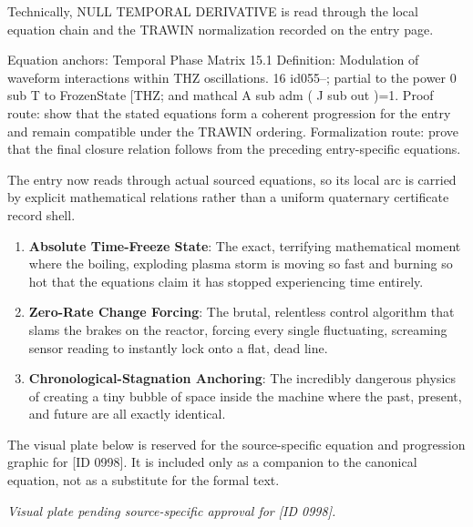 Technically, NULL TEMPORAL DERIVATIVE is read through the local equation chain and the TRAWIN normalization recorded on the entry page.

Equation anchors: Temporal Phase Matrix 15.1 Definition: Modulation of waveform interactions within THZ oscillations. 16 id055--; partial to the power 0 sub T to FrozenState [THZ; and mathcal A sub adm ( J sub out )=1. Proof route: show that the stated equations form a coherent progression for the entry and remain compatible under the TRAWIN ordering. Formalization route: prove that the final closure relation follows from the preceding entry-specific equations.

The entry now reads through actual sourced equations, so its local arc is carried by explicit mathematical relations rather than a uniform quaternary certificate record shell.
\endgroup

\begin{enumerate}[leftmargin=1.6em,itemsep=6pt,topsep=4pt]
\item \textbf{Absolute Time-Freeze State}: The exact, terrifying mathematical moment where the boiling, exploding plasma storm is moving so fast and burning so hot that the equations claim it has stopped experiencing time entirely.
\item \textbf{Zero-Rate Change Forcing}: The brutal, relentless control algorithm that slams the brakes on the reactor, forcing every single fluctuating, screaming sensor reading to instantly lock onto a flat, dead line.
\item \textbf{Chronological-Stagnation Anchoring}: The incredibly dangerous physics of creating a tiny bubble of space inside the machine where the past, present, and future are all exactly identical.
\end{enumerate}

\begingroup\footnotesize\sloppy
The visual plate below is reserved for the source-specific equation and progression graphic for [ID 0998]. It is included only as a companion to the canonical equation, not as a substitute for the formal text.
\par\endgroup
\begingroup\footnotesize\itshape
Visual plate pending source-specific approval for [ID 0998].
\par\endgroup

